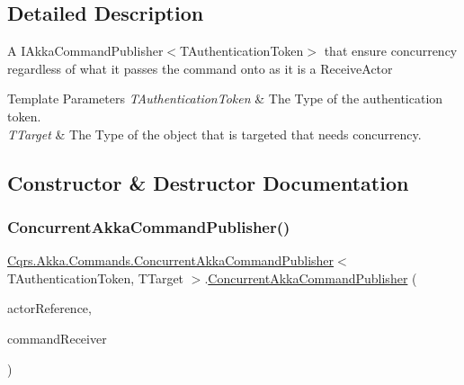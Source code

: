 \subsection{Detailed Description}
A I\+Akka\+Command\+Publisher$<$\+T\+Authentication\+Token$>$ that ensure concurrency regardless of what it passes the command onto as it is a Receive\+Actor 


\begin{DoxyTemplParams}{Template Parameters}
{\em T\+Authentication\+Token} & The Type of the authentication token.\\
\hline
{\em T\+Target} & The Type of the object that is targeted that needs concurrency.\\
\hline
\end{DoxyTemplParams}


\subsection{Constructor \& Destructor Documentation}
\mbox{\label{classCqrs_1_1Akka_1_1Commands_1_1ConcurrentAkkaCommandPublisher_a289c81c8877d2cf83b26f6be7e56f26b_a289c81c8877d2cf83b26f6be7e56f26b}} 
\subsubsection{\texorpdfstring{Concurrent\+Akka\+Command\+Publisher()}{ConcurrentAkkaCommandPublisher()}}
{\footnotesize\ttfamily \hyperlink{classCqrs_1_1Akka_1_1Commands_1_1ConcurrentAkkaCommandPublisher}{Cqrs.\+Akka.\+Commands.\+Concurrent\+Akka\+Command\+Publisher}$<$ T\+Authentication\+Token, T\+Target $>$.\hyperlink{classCqrs_1_1Akka_1_1Commands_1_1ConcurrentAkkaCommandPublisher}{Concurrent\+Akka\+Command\+Publisher} (\begin{DoxyParamCaption}\item[{I\+Actor\+Ref}]{actor\+Reference,  }\item[{\hyperlink{interfaceCqrs_1_1Commands_1_1ICommandReceiver}{I\+Command\+Receiver}$<$ T\+Authentication\+Token $>$}]{command\+Receiver }\end{DoxyParamCaption})}



